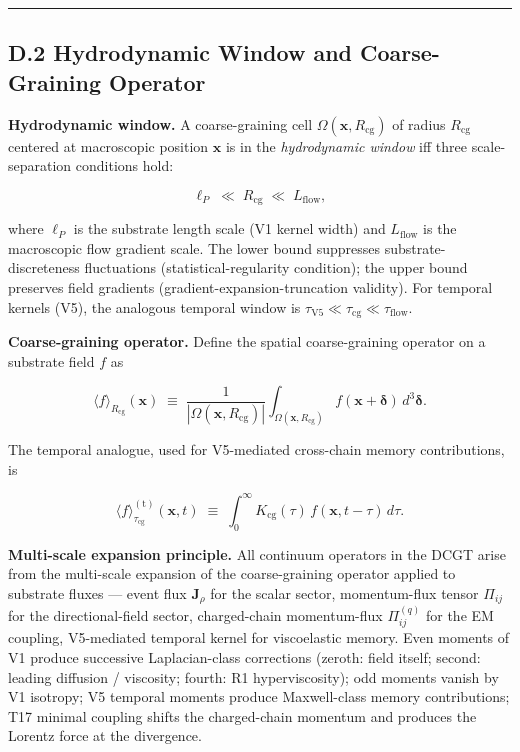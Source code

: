 \documentclass[
]{article}
\begin{document}
\begin{center}\rule{0.5\linewidth}{0.5pt}\end{center}

\subsection{D.2 Hydrodynamic Window and Coarse-Graining
Operator}\label{d.2-hydrodynamic-window-and-coarse-graining-operator}

\textbf{Hydrodynamic window.} A coarse-graining cell
\(\Omega(\mathbf{x},R_\mathrm{cg})\) of radius \(R_\mathrm{cg}\)
centered at macroscopic position \(\mathbf{x}\) is in the
\emph{hydrodynamic window} iff three scale-separation conditions hold:

\[\ell_P \;\ll\; R_\mathrm{cg} \;\ll\; L_\mathrm{flow},\]

where \(\ell_P\) is the substrate length scale (V1 kernel width) and
\(L_\mathrm{flow}\) is the macroscopic flow gradient scale. The lower
bound suppresses substrate-discreteness fluctuations
(statistical-regularity condition); the upper bound preserves field
gradients (gradient-expansion-truncation validity). For temporal kernels
(V5), the analogous temporal window is
\(\tau_\mathrm{V5} \ll \tau_\mathrm{cg} \ll \tau_\mathrm{flow}\).

\textbf{Coarse-graining operator.} Define the spatial coarse-graining
operator on a substrate field \(f\) as

\[\langle f\rangle_{R_\mathrm{cg}}(\mathbf{x}) \;\equiv\; \frac{1}{|\Omega(\mathbf{x},R_\mathrm{cg})|}\int_{\Omega(\mathbf{x},R_\mathrm{cg})} f(\mathbf{x}+\boldsymbol{\delta})\,d^3\boldsymbol{\delta}.\]

The temporal analogue, used for V5-mediated cross-chain memory
contributions, is

\[\langle f\rangle^\mathrm{(t)}_{\tau_\mathrm{cg}}(\mathbf{x},t) \;\equiv\; \int_0^\infty K_\mathrm{cg}(\tau)\,f(\mathbf{x},t-\tau)\,d\tau.\]

\textbf{Multi-scale expansion principle.} All continuum operators in the
DCGT arise from the multi-scale expansion of the coarse-graining
operator applied to substrate fluxes --- event flux \(\mathbf{J}_\rho\)
for the scalar sector, momentum-flux tensor \(\Pi_{ij}\) for the
directional-field sector, charged-chain momentum-flux \(\Pi^{(q)}_{ij}\)
for the EM coupling, V5-mediated temporal kernel for viscoelastic
memory. Even moments of V1 produce successive Laplacian-class
corrections (zeroth: field itself; second: leading diffusion /
viscosity; fourth: R1 hyperviscosity); odd moments vanish by V1
isotropy; V5 temporal moments produce Maxwell-class memory
contributions; T17 minimal coupling shifts the charged-chain momentum
and produces the Lorentz force at the divergence.
\end{document}
